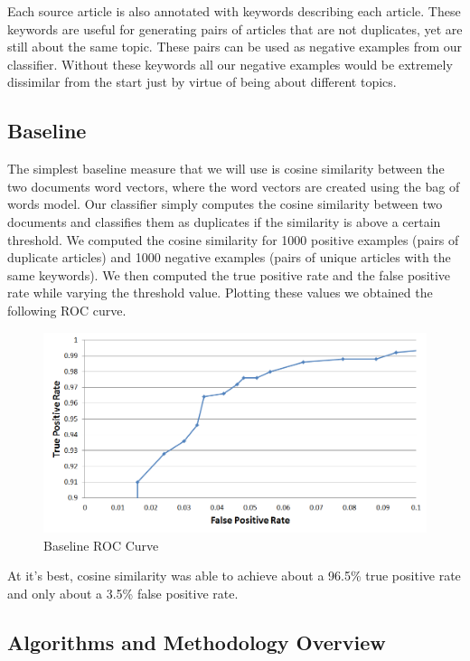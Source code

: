 \documentclass[11pt,letterpaper,oneside, titlepage]{scrartcl}
\begin{document}
Each source article is also annotated with keywords describing each article. These keywords are useful for generating pairs of articles that are not duplicates, yet are still about the same topic. These pairs can be used as negative examples from our classifier. Without these keywords all our negative examples would be extremely dissimilar from the start just by virtue of being about different topics.

\subsection{Baseline}

The simplest baseline measure that we will use is cosine similarity between the two documents word vectors, where the word vectors are created using the bag of words model. Our classifier simply computes the cosine similarity between two documents and classifies them as duplicates if the similarity is above a certain threshold. We computed the cosine similarity for 1000 positive examples (pairs of duplicate articles) and 1000 negative examples (pairs of unique articles with the same keywords). We then computed the true positive rate and the false positive rate while varying the threshold value. Plotting these values we obtained the following ROC curve.

\begin{figure}[h!]
  \centering
  \includegraphics[width=1\textwidth]{baseline_ROC}
  \caption{Baseline ROC Curve}
  \label{fig:baseline_ROC}
\end{figure}

\clearpage

At it’s best, cosine similarity was able to achieve about a 96.5\% true positive rate and only about a 3.5\% false positive rate. 



\subsection{Algorithms and Methodology Overview}
\end{document}
